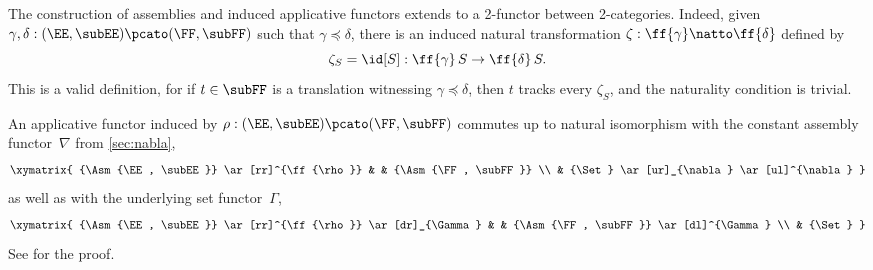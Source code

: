 The construction of assemblies and induced applicative functors extends to a 2-functor between 2-categories. Indeed, given $\gamma, \delta : (\EE, \subEE) \pcato (\FF, \subFF)$ such that $\gamma \preceq \delta$, there is an induced natural transformation $\zeta : \ff{\gamma} \natto \ff{\delta}$ defined by
%
\begin{equation*}
  \zeta_{S} = \id[S] : \ff{\gamma}\,S \to \ff{\delta}\,S.
\end{equation*}
%
This is a valid definition, for if $t \in \subFF$ is a translation witnessing $\gamma \preceq \delta$, then $t$ tracks every $\zeta_{S}$, and the naturality condition is trivial.

An applicative functor induced by $\rho : (\EE, \subEE) \pcato (\FF, \subFF)$ commutes up to natural isomorphism with the constant assembly functor~$\nabla$ from \cref{sec:nabla},
%
\begin{equation*}
  \xymatrix{
    {\Asm{\EE, \subEE}}
    \ar[rr]^{\ff{\rho}}
    & &
    {\Asm{\FF, \subFF}}
    \\
    & {\Set}
    \ar[ur]_{\nabla}
    \ar[ul]^{\nabla}
  }
\end{equation*}
%
as well as with the underlying set functor~$\Gamma$,
%
\begin{equation*}
  \xymatrix{
    {\Asm{\EE, \subEE}}
    \ar[rr]^{\ff{\rho}}
    \ar[dr]_{\Gamma}
    & &
    {\Asm{\FF, \subFF}}
    \ar[dl]^{\Gamma}
    \\
    & {\Set}
  }
\end{equation*}
%
See \cite[Proposition 2.2.4]{Longley:95} for the proof.

